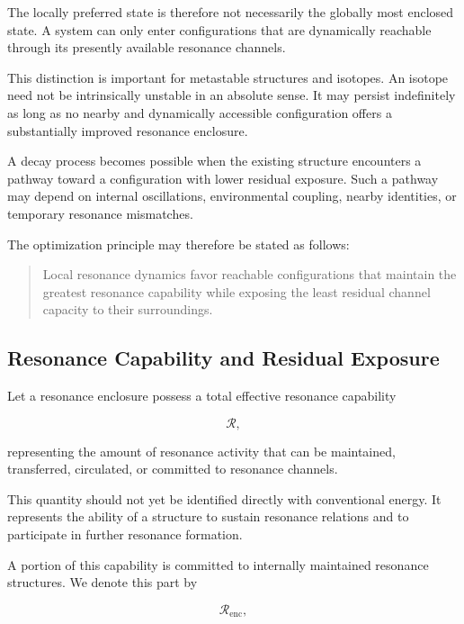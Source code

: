 \documentclass[11pt,a4paper]{article}
\begin{document}
The locally preferred state is therefore not necessarily the globally most enclosed state. A system can only enter configurations that are dynamically reachable through its presently available resonance channels.

This distinction is important for metastable structures and isotopes. An isotope need not be intrinsically unstable in an absolute sense. It may persist indefinitely as long as no nearby and dynamically accessible configuration offers a substantially improved resonance enclosure.

A decay process becomes possible when the existing structure encounters a pathway toward a configuration with lower residual exposure. Such a pathway may depend on internal oscillations, environmental coupling, nearby identities, or temporary resonance mismatches.

The optimization principle may therefore be stated as follows:

\begin{quote}
Local resonance dynamics favor reachable configurations that maintain the greatest resonance capability while exposing the least residual channel capacity to their surroundings.
\end{quote}


\subsection{Resonance Capability and Residual Exposure}
\label{sec:resonance_capability_residual_exposure}

Let a resonance enclosure possess a total effective resonance capability

\begin{equation}
    \mathcal{R},
\end{equation}

representing the amount of resonance activity that can be maintained, transferred, circulated, or committed to resonance channels.

This quantity should not yet be identified directly with conventional energy. It represents the ability of a structure to sustain resonance relations and to participate in further resonance formation.

A portion of this capability is committed to internally maintained resonance structures. We denote this part by

\begin{equation}
    \mathcal{R}_{\mathrm{enc}},
\end{equation}
\end{document}
